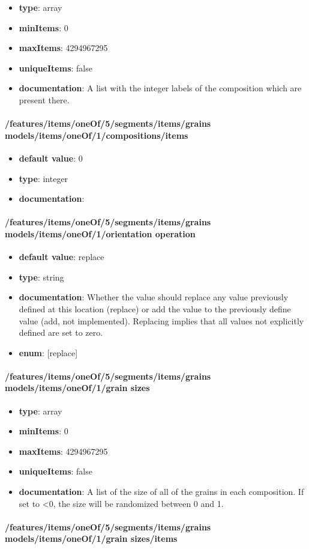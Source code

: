 \begin{itemize}\item {\bf type}: array
\item {\bf minItems}: 0
\item {\bf maxItems}: 4294967295
\item {\bf uniqueItems}: false
\item {\bf documentation}: A list with the integer labels of the composition which are present there.
\end{itemize}\paragraph{/features/items/oneOf/5/segments/items/grains models/items/oneOf/1/compositions/items}
\begin{itemize}\item {\bf default value}: 0
\item {\bf type}: integer
\item {\bf documentation}: 
\end{itemize}\paragraph{/features/items/oneOf/5/segments/items/grains models/items/oneOf/1/orientation operation}
\begin{itemize}\item {\bf default value}: replace
\item {\bf type}: string
\item {\bf documentation}: Whether the value should replace any value previously defined at this location (replace) or add the value to the previously define value (add, not implemented). Replacing implies that all values not explicitly defined are set to zero.
\item {\bf enum}: [replace]\end{itemize}\paragraph{/features/items/oneOf/5/segments/items/grains models/items/oneOf/1/grain sizes}
\begin{itemize}\item {\bf type}: array
\item {\bf minItems}: 0
\item {\bf maxItems}: 4294967295
\item {\bf uniqueItems}: false
\item {\bf documentation}: A list of the size of all of the grains in each composition. If set to <0, the size will be randomized between 0 and 1.
\end{itemize}\paragraph{/features/items/oneOf/5/segments/items/grains models/items/oneOf/1/grain sizes/items}
